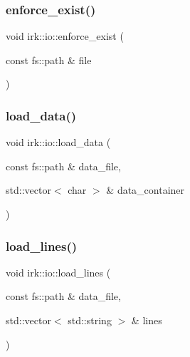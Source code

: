 \mbox{\label{namespaceirk_1_1io_aa9967d537be4185e88420785431fb63b}} 
\subsubsection{\texorpdfstring{enforce\+\_\+exist()}{enforce\_exist()}}
{\footnotesize\ttfamily void irk\+::io\+::enforce\+\_\+exist (\begin{DoxyParamCaption}\item[{const fs\+::path \&}]{file }\end{DoxyParamCaption})\hspace{0.3cm}{\ttfamily [inline]}}

\mbox{\label{namespaceirk_1_1io_a2ec8cb8d9886450819cc9ee7ff2049ce}} 
\subsubsection{\texorpdfstring{load\+\_\+data()}{load\_data()}}
{\footnotesize\ttfamily void irk\+::io\+::load\+\_\+data (\begin{DoxyParamCaption}\item[{const fs\+::path \&}]{data\+\_\+file,  }\item[{std\+::vector$<$ char $>$ \&}]{data\+\_\+container }\end{DoxyParamCaption})\hspace{0.3cm}{\ttfamily [inline]}}

\mbox{\label{namespaceirk_1_1io_af4c16c7d4b0a5323130f2b8dd2be8462}} 
\subsubsection{\texorpdfstring{load\+\_\+lines()}{load\_lines()}\hspace{0.1cm}{\footnotesize\ttfamily [1/2]}}
{\footnotesize\ttfamily void irk\+::io\+::load\+\_\+lines (\begin{DoxyParamCaption}\item[{const fs\+::path \&}]{data\+\_\+file,  }\item[{std\+::vector$<$ std\+::string $>$ \&}]{lines }\end{DoxyParamCaption})\hspace{0.3cm}{\ttfamily [inline]}}

